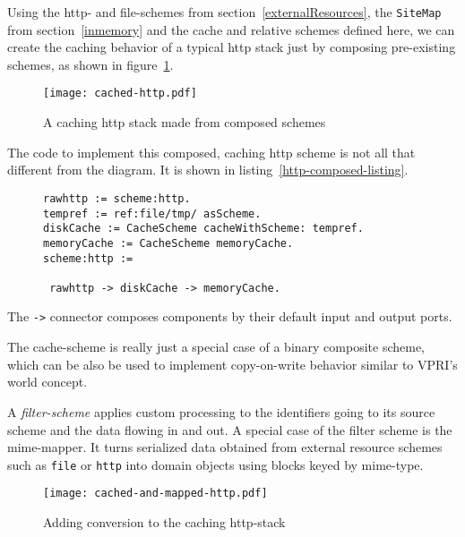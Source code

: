 \documentclass[preprint,authoryear]{acm_proc_article-sp}
\begin{document}
Using the http- and file-schemes from section~\ref{externalResources}, the
{\tt SiteMap} from section~\ref{inmemory} and the cache and
relative schemes defined here, we can create the 
caching behavior of a typical http stack just by composing
pre-existing schemes, as shown in figure~\ref{http-cached}.


\begin{figure}[htbp]
\caption{A caching http stack made from composed schemes}
\label{http-cached}
\begin{center}
\texttt{[image: cached-http.pdf]}
\end{center}
\end{figure}

The code to implement this composed, caching http scheme is not all 
that different from the diagram.  It is shown in listing~\ref{http-composed-listing}.

\begin{figure}[htbp]
\begin{lstlisting}[style=L,label=http-composed-listing,caption=Code for caching http stack.]
rawhttp := scheme:http.
tempref := ref:file/tmp/ asScheme.
diskCache := CacheScheme cacheWithScheme: tempref.
memoryCache := CacheScheme memoryCache.
scheme:http := 

 rawhttp -> diskCache -> memoryCache.
\end{lstlisting}
\end{figure}

The {\tt ->} connector composes components by their default input
and output ports.

The cache-scheme is really just a special case of a binary composite scheme,
which can be also be used to implement copy-on-write behavior similar to
VPRI's world concept\cite{vpriworlds}.

A {\em filter-scheme} applies custom processing to the identifiers going to
its source scheme and the data flowing in and out.  A special case of the 
filter scheme is the mime-mapper.  It turns serialized data obtained from
external resource schemes such as {\tt file} or {\tt http} into domain objects
using blocks keyed by mime-type.  

\begin{figure}[htbp]
\caption{Adding conversion to the caching http-stack}
\label{http-cached-converted}
\begin{center}
\texttt{[image: cached-and-mapped-http.pdf]}
\end{center}
\end{figure}
\end{document}
